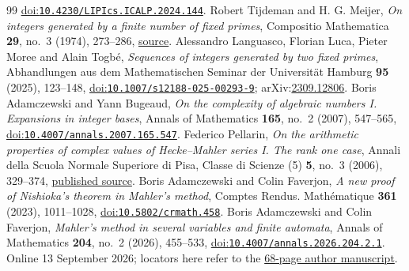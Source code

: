\documentclass[11pt]{article}
\theoremstyle{remark}
\theoremstyle{plain}
\begin{document}
\begin{thebibliography}{99}
  \href{https://doi.org/10.4230/LIPIcs.ICALP.2024.144}{doi:\nolinkurl{10.4230/LIPIcs.ICALP.2024.144}}.
 Robert Tijdeman and H. G. Meijer,
  \emph{On integers generated by a finite number of fixed primes}, Compositio Mathematica \textbf{29}, no.~3 (1974), 273--286,
  \href{https://www.numdam.org/article/CM_1974__29_3_273_0.pdf}{source}.
 Alessandro Languasco, Florian Luca, Pieter Moree and Alain Togb\'{e},
  \emph{Sequences of integers generated by two fixed primes}, Abhandlungen aus dem Mathematischen Seminar der Universität Hamburg \textbf{95} (2025), 123--148,
  \href{https://doi.org/10.1007/s12188-025-00293-9}{doi:\nolinkurl{10.1007/s12188-025-00293-9}}; arXiv:\href{https://arxiv.org/abs/2309.12806}{2309.12806}.
 Boris Adamczewski and Yann Bugeaud,
  \emph{On the complexity of algebraic numbers I. Expansions in integer bases},
  Annals of Mathematics \textbf{165}, no.~2 (2007), 547--565,
  \href{https://doi.org/10.4007/annals.2007.165.547}{doi:\nolinkurl{10.4007/annals.2007.165.547}}.
 Federico Pellarin,
  \emph{On the arithmetic properties of complex values of Hecke--Mahler series I.
  The rank one case}, Annali della Scuola Normale Superiore di Pisa,
  Classe di Scienze (5) \textbf{5}, no.~3 (2006), 329--374,
  \href{https://www.numdam.org/item/ASNSP_2006_5_5_3_329_0/}{published source}.
 Boris Adamczewski and Colin Faverjon,
  \emph{A new proof of Nishioka's theorem in Mahler's method},
  Comptes Rendus. Math\'ematique \textbf{361} (2023), 1011--1028,
  \href{https://doi.org/10.5802/crmath.458}{doi:\nolinkurl{10.5802/crmath.458}}.
 Boris Adamczewski and Colin Faverjon,
  \emph{Mahler's method in several variables and finite automata},
  Annals of Mathematics \textbf{204}, no.~2 (2026), 455--533,
  \href{https://doi.org/10.4007/annals.2026.204.2.1}{doi:\nolinkurl{10.4007/annals.2026.204.2.1}}.
  Online 13 September 2026; locators here refer to the
  \href{https://faverjon.perso.math.cnrs.fr/AdamczewskiFaverjon_MahlerFiniteAutomata.pdf}{68-page author manuscript}.
\end{thebibliography}
\end{document}
